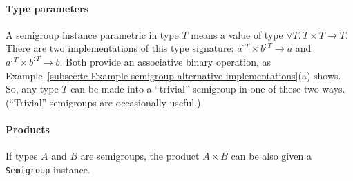 \paragraph{Type parameters}

A semigroup instance parametric in type $T$ means a value of type
$\forall T.\,T\times T\rightarrow T$. There are two implementations
of this type signature: $a^{:T}\times b^{:T}\rightarrow a$ and $a^{:T}\times b^{:T}\rightarrow b$.
Both provide an associative binary operation, as Example~\ref{subsec:tc-Example-semigroup-alternative-implementations}(a)
shows. So, any type $T$ can be made into a \textsf{``}trivial\textsf{''} semigroup
in one of these two ways. (\textsf{``}Trivial\textsf{''}
semigroups are occasionally useful.)

\paragraph{Products}

If types $A$ and $B$ are semigroups, the product $A\times B$ can
be also given a \lstinline!Semigroup! instance. 

